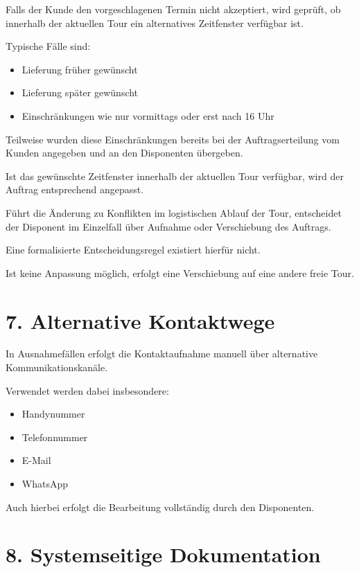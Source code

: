 \documentclass[a4paper,11pt]{article}
\begin{document}
	Falls der Kunde den vorgeschlagenen Termin nicht akzeptiert, wird geprüft,
	ob innerhalb der aktuellen Tour ein alternatives Zeitfenster verfügbar ist.
	
	Typische Fälle sind:
	
	\begin{itemize}
		\item Lieferung früher gewünscht
		\item Lieferung später gewünscht
		\item Einschränkungen wie nur vormittags oder erst nach 16 Uhr
	\end{itemize}
	
	Teilweise wurden diese Einschränkungen bereits bei der Auftragserteilung vom
	Kunden angegeben und an den Disponenten übergeben.
	
	Ist das gewünschte Zeitfenster innerhalb der aktuellen Tour verfügbar, wird der
	Auftrag entsprechend angepasst.
	
	Führt die Änderung zu Konflikten im logistischen Ablauf der Tour, entscheidet
	der Disponent im Einzelfall über Aufnahme oder Verschiebung des Auftrags.
	
	Eine formalisierte Entscheidungsregel existiert hierfür nicht.
	
	Ist keine Anpassung möglich, erfolgt eine Verschiebung auf eine andere freie Tour.
	
	\section*{7. Alternative Kontaktwege}
	
	In Ausnahmefällen erfolgt die Kontaktaufnahme manuell über alternative
	Kommunikationskanäle.
	
	Verwendet werden dabei insbesondere:
	
	\begin{itemize}
		\item Handynummer
		\item Telefonnummer
		\item E-Mail
		\item WhatsApp
	\end{itemize}
	
	Auch hierbei erfolgt die Bearbeitung vollständig durch den Disponenten.
	
	\section*{8. Systemseitige Dokumentation}
	
\end{document}
